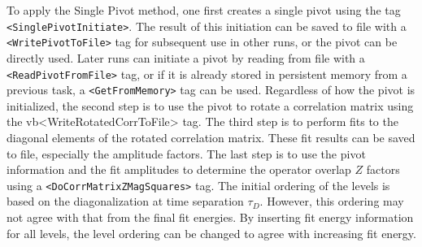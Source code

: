 \documentclass[12pt]{article}
\newcommand{\vb}{\texttt}
\begin{document}
To apply the Single Pivot method, one first creates a single pivot using the tag\newline
\vb{<SinglePivotInitiate>}.  The result of this initiation can be saved to file 
with a \newline\vb{<WritePivotToFile>} tag for subsequent use in other runs, or the pivot 
can be directly used.  Later runs can initiate a pivot by reading from file with a 
\vb{<ReadPivotFromFile>} tag, or if it is already stored in persistent memory from 
a previous task, a \vb{<GetFromMemory>} tag can be used.  Regardless of how the 
pivot is initialized, the second step is to use the pivot to rotate a correlation      
matrix using the vb{<WriteRotatedCorrToFile>} tag.  The third step is to perform  
fits to the diagonal elements of the rotated correlation matrix.  These fit   
results can be saved to file, especially the amplitude factors.  The last     
step is to use the pivot information and the fit amplitudes to determine the  
operator overlap $Z$ factors using a \vb{<DoCorrMatrixZMagSquares>} tag.        
The initial ordering of the levels is based on the diagonalization at time    
separation $\tau_D$.  However, this ordering may not agree with that from       
the final fit energies. By inserting fit energy information for all levels,   
the level ordering can be changed to agree with increasing fit energy.        
                                                            
\end{document}
